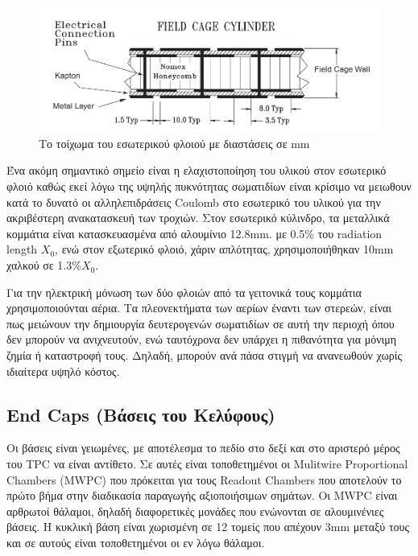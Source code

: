 	
	\begin{figure}[h!]
			\centering 
			\includegraphics[scale=0.4]{STAR_Detectors/Inner_field_cage_wall}
			\caption{Το τοίχωμα του εσωτερικού φλοιού με διαστάσεις σε mm}
			\label{fig3.8}
		\end{figure}
		
	Ένα ακόμη σημαντικό σημείο είναι η ελαχιστοποίηση του υλικού στον εσωτερικό φλοιό καθώς εκεί λόγω της υψηλής πυκνότητας σωματιδίων είναι κρίσιμο να μειωθουν κατά το δυνατό οι αλληλεπιδράσεις Coulomb στο εσωτερικό του υλικού για την ακριβέστερη ανακατασκευή των τροχιών. 
	Στον εσωτερικό κύλινδρο, τα μεταλλικά κομμάτια είναι κατασκευασμένα από αλουμίνιο 12.8mm. με 0.5\% του radiation length $X_0$, ενώ στον εξωτερικό φλοιό, χάριν απλότητας, χρησιμοποιήθηκαν 10mm χαλκού σε 1.3\%$X_0$.
	
	Για την ηλεκτρική μόνωση των δύο φλοιών από τα γειτονικά τους κομμάτια χρησιμοποιούνται αέρια. Τα πλεονεκτήματα των αερίων έναντι των στερεών, είναι πως μειώνουν την δημιουργία δευτερογενών σωματιδίων σε αυτή την περιοχή όπου δεν μπορούν να ανιχνευτούν, ενώ ταυτόχρονα δεν υπάρχει η πιθανότητα για μόνιμη ζημία ή καταστροφή τους. Δηλαδή, μπορούν ανά πάσα στιγμή να ανανεωθούν χωρίς ιδιαίτερα υψηλό κόστος.
	
\subsection{End Caps (Βάσεις του Κελύφους)}

 Οι βάσεις είναι γειωμένες, με αποτέλεσμα το πεδίο στο δεξί και στο αριστερό μέρος του TPC  να είναι αντίθετο. 
 Σε αυτές είναι τοποθετημένοι οι  Mulitwire Proportional Chambers (MWPC) που πρόκειται για τους Readout Chambers που αποτελούν το πρώτο βήμα στην διαδικασία παραγωγής αξιοποιήσιμων σημάτων. Οι MWPC είναι αρθρωτοί θάλαμοι, δηλαδή διαφορετικές μονάδες που ενώνονται σε αλουμινένιες βάσεις. Η κυκλική βάση είναι χωρισμένη σε 12 τομείς που απέχουν 3mm μεταξύ τους και σε αυτούς είναι τοποθετημένοι οι εν λόγω θάλαμοι.  
	
